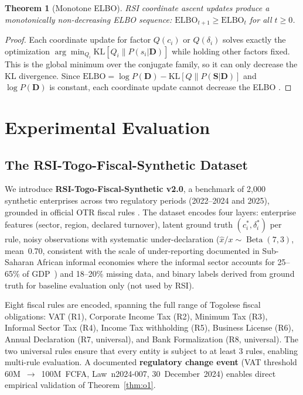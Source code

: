 \documentclass[letterpaper]{article}
\newtheorem{theorem}{Theorem}
\begin{document}
\begin{theorem}[Monotone ELBO]
\label{thm:elbo}
RSI coordinate ascent updates produce a monotonically non-decreasing
ELBO sequence: $\mathrm{ELBO}_{t+1} \geq \mathrm{ELBO}_t$ for all
$t \geq 0$.
\end{theorem}

\begin{proof}
Each coordinate update for factor $Q(c_i)$ or $Q(\delta_i)$ solves
exactly the optimization
$\arg\min_{Q_i} \mathrm{KL}[Q_i \| P(s_i|\mathbf{D})]$ while holding
other factors fixed. This is the global minimum over the conjugate
family, so it can only decrease the KL divergence. Since
$\mathrm{ELBO} = \log P(\mathbf{D}) - \mathrm{KL}[Q \| P(\mathbf{S}|\mathbf{D})]$
and $\log P(\mathbf{D})$ is constant, each coordinate update cannot
decrease the ELBO \citep{blei2017variational}.
\end{proof}

\section{Experimental Evaluation}
\label{sec:experiments}

\subsection{The RSI-Togo-Fiscal-Synthetic Dataset}

We introduce \textbf{RSI-Togo-Fiscal-Synthetic v2.0}, a benchmark of
2{,}000 synthetic enterprises across two regulatory periods
(2022--2024 and 2025), grounded in official OTR fiscal rules
\citep{otr2024lf}. The dataset encodes four layers: enterprise features
(sector, region, declared turnover), latent ground truth
$(c_i^*, \delta_i^*)$ per rule, noisy observations with systematic
under-declaration ($\hat{x}/x \sim \operatorname{Beta}(7,3)$,
mean~0.70, consistent with the scale of under-reporting documented in
Sub-Saharan African informal economies where the informal sector
accounts for 25--65\% of GDP~\citep{medina2017informal}) and 18--20\% missing data, and binary labels derived from
ground truth for baseline evaluation only (not used by RSI).

Eight fiscal rules are encoded, spanning the full range of Togolese
fiscal obligations: VAT (R1), Corporate Income Tax (R2), Minimum Tax
(R3), Informal Sector Tax (R4), Income Tax withholding (R5), Business
License (R6), Annual Declaration (R7, universal), and Bank
Formalization (R8, universal). The two universal rules ensure that
every entity is subject to at least 3 rules, enabling multi-rule
evaluation. A documented \textbf{regulatory change event} (VAT
threshold 60M~$\to$~100M~FCFA, Law~n\textdegree{}2024-007,
30~December~2024) enables direct empirical validation of
Theorem~\ref{thm:o1}.
\end{document}

